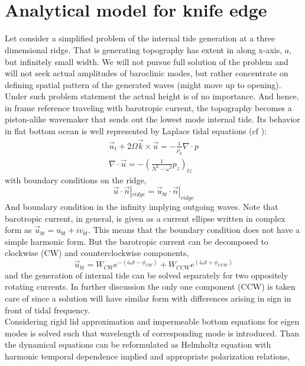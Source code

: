 \section{\\Analytical model for knife edge}
Let consider a simplified problem of the internal tide generation at a three dimensional ridge. That is generating topography has extent in along x-axis, $a$, but infinitely small width. We will not pursue full solution of the problem and will not seek actual amplitudes of baroclinic modes, but rather concentrate on defining spatial pattern of the generated waves (might move up to opening). Under such problem statement the actual height is of no importance. And hence, in frame reference traveling with barotropic current, the topography becomes a piston-alike wavemaker that sends out the lowest mode internal tide. Its behavior in flat bottom ocean is well represented by Laplace tidal equations (cf \cite{kelly2012cascade}):
\begin{align}
\vec{u}_t + 2 \Omega \vec{k} \times \vec{u} = - \frac{1}{\rho_0} \nabla \cdot p\\
\nabla \cdot \vec{u} = -(\frac{1}{N^2 - \omega^2}p_z)_{tz}
\end{align}
with boundary conditions on the ridge,
\begin{equation}
\vec{u}\cdot \vec{n}|_{ridge} = \vec{u}_{bt} \cdot \vec{n} |_{ridge}
\end{equation}
And boundary condition in the infinity implying outgoing waves. Note that barotropic current, in general, is given as a current ellipse written in complex form as $\vec{u}_{bt} = u_{bt} + i v_{bt}$. This means that the boundary condition does not have a simple harmonic form. But the barotropic current can be decomposed to clockwise (CW) and counterclockwise components,
\begin{equation}
\vec{u}_{bt} = W_{CW} e^{-(i \omega t - \phi_{CW})} + W_{CCW} e^{(i \omega t + \phi_{CCW})}
\end{equation}
and the generation of internal tide can be solved separately for two oppositely rotating currents. In further discussion the only one component (CCW) is taken care of since a solution will have similar form with differences arising in sign in front of tidal frequency.\\
Considering rigid lid approximation and impermeable bottom equations for eigen modes is solved such that wavelength of corresponding mode is introduced. Than the dynamical equations can be reformulated as Helmholtz equation with harmonic temporal dependence implied and appropriate polarization relations,
